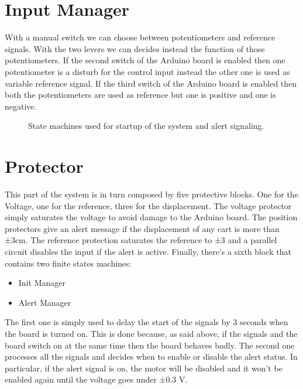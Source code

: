 \section{Input Manager}
With a manual switch we can choose between potentiometers and reference signals. With the two levers we can decides instead the function of those potentiometers. 
If the second switch of the Arduino board is enabled then one potentiometer is a disturb for the control input instead the other one is used as variable reference signal. 
If the third switch of the Arduino board is enabled then both the potentiometers are used as reference but one is positive and one is negative. 
 \begin{figure}[!h]
 	\centering
 	\hspace{1cm}
 	
 	\caption{State machines used for startup of the system and alert signaling.}
 	
 \end{figure}
\section{Protector}
This part of the system is in turn composed by five protective blocks. One for the Voltage, one for the reference, three for the displacement. 
The voltage protector simply saturates the voltage to avoid damage to the Arduino board.
The position protectors give an alert message if the displacement of any cart is more than ±3cm.
The reference protection saturates the reference to ±3 and a parallel circuit disables the input if the alert is active.
Finally, there’s a sixth block that contains two finite states machines: 
\begin{itemize}
	\item Init Manager
	\item Alert Manager
\end{itemize}
The first one is simply used to delay the start of the signals by 3 seconds when the board is turned on. This is done because, as said above, if the signals and the board switch on at the same time then the board behaves badly. 
The second one processes all the signals and decides when to enable or disable the alert status. In particular, if the alert signal is on, the motor will be disabled and it won’t be enabled again until the voltage goes under ±0.3 V. 

